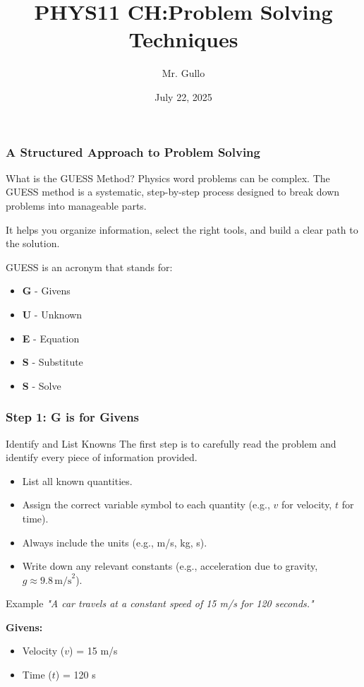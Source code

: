 \documentclass{beamer}
\title[Problem Solving]{PHYS11 CH:Problem Solving Techniques}
\author[Mr. Gullo]{Mr. Gullo}
\date[Jul 22, 2025]{July 22, 2025}
\begin{document}
\begin{frame}[allowframebreaks]
    \titlepage
\end{frame}

\begin{frame}[allowframebreaks]
    \frametitle{A Structured Approach to Problem Solving}
    \begin{block}{What is the GUESS Method?}
        Physics word problems can be complex. The \alert{GUESS method} is a systematic, step-by-step process designed to break down problems into manageable parts.
        \vspace{1em}

        It helps you organize information, select the right tools, and build a clear path to the solution.
        \vspace{1em}

        GUESS is an acronym that stands for:
        \begin{itemize}
            \item \textbf{G} - Givens
            \item \textbf{U} - Unknown
            \item \textbf{E} - Equation
            \item \textbf{S} - Substitute
            \item \textbf{S} - Solve
        \end{itemize}
    \end{block}
\end{frame}

\begin{frame}[allowframebreaks]
    \frametitle{Step 1: G is for Givens}
    \begin{block}{Identify and List Knowns}
        The first step is to carefully read the problem and identify every piece of information provided.
        \begin{itemize}
            \item List all known quantities.
            \item Assign the correct variable symbol to each quantity (e.g., $v$ for velocity, $t$ for time).
            \item Always include the units (e.g., m/s, kg, s).
            \item Write down any relevant constants (e.g., acceleration due to gravity, $g \approx 9.8 \, \text{m/s}^2$).
        \end{itemize}
    \end{block}
    \begin{exampleblock}{Example}
        \textit{"A car travels at a constant speed of 15 m/s for 120 seconds."}
        \vspace{1em}
        
        \textbf{Givens:}
        \begin{itemize}
            \item Velocity ($v$) = 15 m/s
            \item Time ($t$) = 120 s
        \end{itemize}
    \end{exampleblock}
\end{frame}
\end{document}
